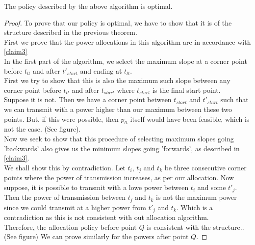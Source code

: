 \begin{theorem}
The policy described by the above algorithm is optimal.
\end{theorem}
\begin{proof}
To prove that our policy is optimal, we have to show that it is of the structure described in the previous theorem. \\
First we prove that the power allocations in this algorithm are in accordance with \eqref{claim3}\\
In the first part of the algorithm, we select the maximum slope at a corner point before $t_{lt}$ and after $t'_{start}$ and ending at $t_{lt}$. \\
First we try to show that this is also the maximum such slope between any corner point before $t_{lt}$ and after $t_{start}$ where $t_{start}$ is the final start point. \\
Suppose it is not. Then we have a corner point between $t_{start}$ and $t'_{start}$ such that we can transmit with a power higher than our maximum between these two points. But, if this were possible, then 
$p_{lt}$ itself would have been feasible, which is not the case. (See figure).\\
Now we seek to show that this procedure of selecting maximum slopes going 'backwards' also gives us the minimum slopes going 'forwards', as described in \eqref{claim3}.\\
We shall show this by contradiction. Let $t_i$, $t_j$ and $t_k$ be three consecutive corner points where the power of transmission increases, as per our allocation. Now suppose, it is possible to transmit with a lowe power between $t_i$ and some $t'_j$. 
Then the power of transmission between $t_j$ and $t_k$ is not the maximum power since we could transmit at a higher power from $t'_j$ and $t_k$. Which is a contradiction as this is not consistent with out allocation algorithm.\\
Therefore, the allocation policy before point $Q$ is consistent with the structure.. (See figure)
We can prove similarly for the powers after point $Q$.
\end{proof}




